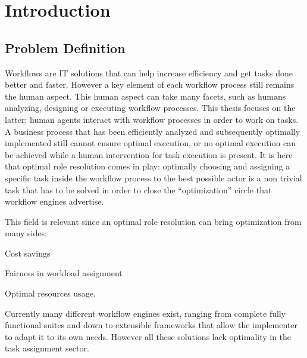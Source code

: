 \documentclass[draft=false]{seal_thesis}
\begin{document}
\begin{zusammenfassung}
\end{zusammenfassung}

\tableofcontents

\clearpage

\listoffigures

\clearpage

\listoftables

\mainmatter

\glsresetall

\chapter{Introduction}
\label{ch:intro}

\section{Problem Definition}

Workflows are IT solutions that can help increase efficiency and get tasks done better and faster. However a key element of each workflow process still remains the human aspect. This human aspect can take many facets, such as humans analyzing, designing or executing workflow processes. This thesis focuses on the latter: human agents interact with workflow processes in order to work on tasks. A business process that has been efficiently analyzed and subsequently optimally implemented still cannot ensure optimal execution, or no optimal execution can be achieved while a human intervention for task execution is present. It is here that optimal role resolution comes in play: optimally choosing and assigning a specific task inside the workflow process to the best possible actor is a non trivial task that has to be solved in order to close the ``optimization'' circle that workflow engines advertise.

This field is relevant since an optimal role resolution can bring optimization from many sides:
\begin{enumerate*}
	\item Cost savings
	\item Fairness in workload assignment
	\item Optimal resources usage.
\end{enumerate*}

Currently many different workflow engines exist, ranging from complete fully functional suites and down to extensible frameworks that allow the implementer to adapt it to its own needs. However all these solutions lack optimality in the task assignment sector.
\end{document}
